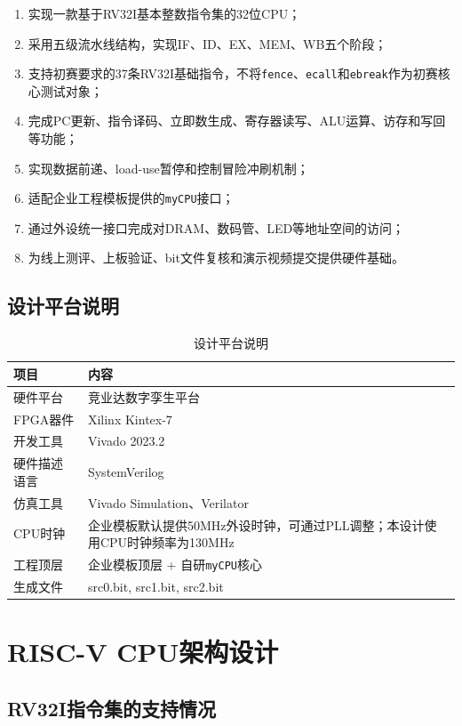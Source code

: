 \documentclass[UTF8,a4paper,12pt]{ctexart}
\newcommand{\code}[1]{\texttt{#1}}
\begin{document}
\begin{enumerate}
    \item 实现一款基于RV32I基本整数指令集的32位CPU；
    \item 采用五级流水线结构，实现IF、ID、EX、MEM、WB五个阶段；
    \item 支持初赛要求的37条RV32I基础指令，不将\code{fence}、\code{ecall}和\code{ebreak}作为初赛核心测试对象；
    \item 完成PC更新、指令译码、立即数生成、寄存器读写、ALU运算、访存和写回等功能；
    \item 实现数据前递、load-use暂停和控制冒险冲刷机制；
    \item 适配企业工程模板提供的\code{myCPU}接口；
    \item 通过外设统一接口完成对DRAM、数码管、LED等地址空间的访问；
    \item 为线上测评、上板验证、bit文件复核和演示视频提交提供硬件基础。
\end{enumerate}

\subsection{设计平台说明}

\begin{table}[H]
\centering
\caption{设计平台说明}
\begin{tabularx}{\textwidth}{p{4cm}X}
\toprule
项目 & 内容 \\
\midrule
硬件平台 & {竞业达数字孪生平台} \\
FPGA器件 & {Xilinx Kintex-7} \\
开发工具 & {Vivado 2023.2} \\
硬件描述语言 & SystemVerilog \\
仿真工具 & {Vivado Simulation、Verilator} \\
CPU时钟 & 企业模板默认提供50MHz外设时钟，可通过PLL调整；本设计使用CPU时钟频率为{130MHz} \\
工程顶层 & 企业模板顶层 + 自研\code{myCPU}核心 \\
生成文件 & {src0.bit, src1.bit, src2.bit} \\
\bottomrule
\end{tabularx}
\end{table}

\section{RISC-V CPU架构设计}

\subsection{RV32I指令集的支持情况}
\end{document}
